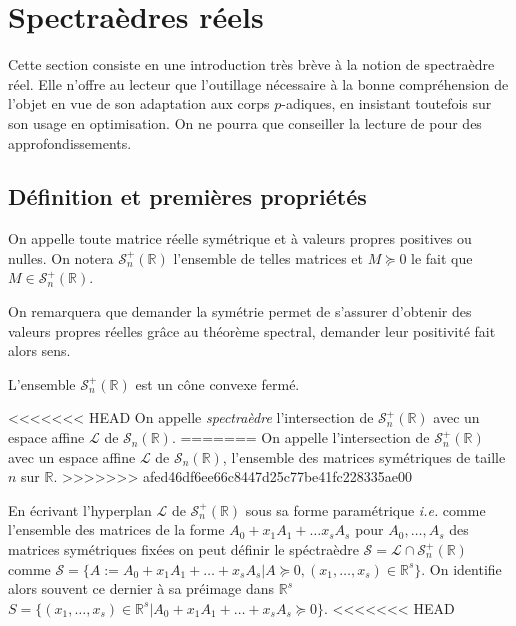 \section{Spectraèdres réels}
\label{sec:casreel} 
Cette section consiste en une introduction très brève à la notion de spectraèdre réel. Elle n'offre au lecteur que l'outillage nécessaire à la bonne compréhension de l'objet en vue de son adaptation aux corps $p$-adiques, en insistant toutefois sur son usage en optimisation. On ne pourra que conseiller la lecture de \cite{grigoriy_semidefinite_2012} pour des approfondissements.  
\subsection{Définition et premières propriétés}

\begin{definition}
	On appelle  toute matrice réelle symétrique et à valeurs propres positives ou nulles.
	On notera $\mathcal{S}_n^+\left(\mathbb{R}\right) $ l'ensemble de telles matrices et $M \succeq 0$ le fait que $M \in \mathcal{S}_n^+\left(\mathbb{R}\right)$.
\end{definition}

\begin{remarque}
	On remarquera que demander la symétrie permet de s'assurer d'obtenir des valeurs propres réelles grâce au théorème spectral, demander leur positivité fait alors sens.
\end{remarque}
\begin{propriete}
	L'ensemble $\mathcal{S}_n^+\left( \mathbb{R} \right) $ est un cône convexe fermé.
\end{propriete}

\begin{definition}
<<<<<<< HEAD
	On appelle \emph{spectraèdre} l'intersection de $\mathcal{S}_n^+\left(\mathbb{R}\right)$ avec un espace affine $\mathcal{L}$ de $\mathcal{S}_n\left(\mathbb{R}\right)$.
=======
	On appelle  l'intersection de $\mathcal{S}_n^+\left(\mathbb{R}\right)$ avec un espace affine $\mathcal{L}$ de $\mathcal{S}_n\left(\mathbb{R}\right)$, l'ensemble des matrices symétriques de taille $n$ sur $\mathbb{R}$.
>>>>>>> afed46df6ee66c8447d25c77be41fc228335ae00
\end{definition}

En écrivant l'hyperplan $\mathcal{L}$ de $\mathcal{S}_n^+\left(\mathbb{R}\right)$ sous sa forme paramétrique \textit{i.e.} comme l'ensemble des matrices de la forme $A_0 + x_1 A_1 + \ldots x_s A_s$ pour $A_0,\ldots, A_s$ des matrices symétriques fixées on peut définir le spéctraèdre $\mathcal{S} = \mathcal{L} \cap \mathcal{S}_n^+\left(\mathbb{R}\right)$ comme
$\mathcal{S} = \{A := A_0 + x_1A_1 + \ldots + x_s A_s | A \succeq 0, (x_1,\ldots,x_s) \in \mathbb{R}^s\}$. On identifie alors souvent ce dernier à sa préimage dans $\mathbb{R}^s$
$S = \{(x_1,\ldots,x_s) \in \mathbb{R}^s | A_0+ x_1A_1 + \ldots+ x_s A_s \succeq 0 \}. $
<<<<<<< HEAD

